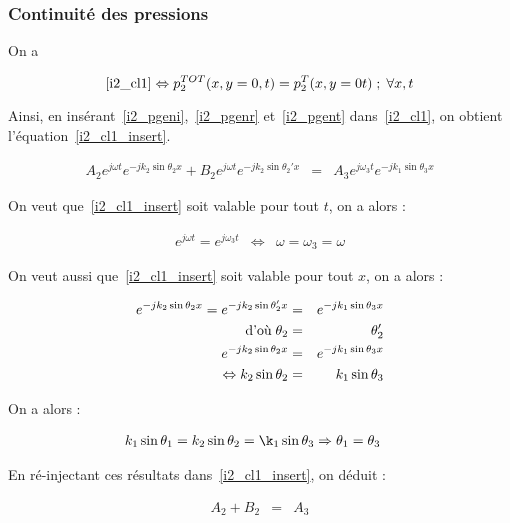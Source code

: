 \subsubsection{Continuité des pressions}

On a 

\begin{equation*}
\eqref{i2_cl1} \Leftrightarrow p^{TOT}_2(x,y=0,t) = p^T_2(x, y=0 t) \;;\; \forall x,t 
\end{equation*}

Ainsi, en insérant~\eqref{i2_pgeni},~\eqref{i2_pgenr} et~\eqref{i2_pgent} dans~\eqref{i2_cl1}, on obtient
l'équation~\eqref{i2_cl1_insert}.

\begin{eqnarray}
    A_2e^{j\omega t}e^{-jk_2\sin\theta_2x} + B_2e^{j\omega t}e^{-jk_2\sin\theta_2'x} & = & A_3e^{j\omega_3t}e^{-jk_1\sin\theta_3x} \label{i2_cl1_insert}
\end{eqnarray}

On veut que~\eqref{i2_cl1_insert} soit valable pour tout $t$, on a alors :

\begin{eqnarray}
    e^{j\omega t} = e^{j\omega_3t} & \Leftrightarrow &\omega = \omega_3 = \omega \label{i2_pulsrel}
\end{eqnarray}

On veut aussi que~\eqref{i2_cl1_insert} soit valable pour tout $x$, on a alors :

\begin{eqnarray}
    e^{-jk_2\sin\theta_2x} = e^{-jk_2\sin\theta_2'x} & = & e^{-jk_1\sin\theta_3x}\notag\\
    \text{d'où}\;\theta_2 & = & \theta_2'\label{i2_theta1rel}\\
    e^{-jk_2\sin\theta_2x} & = & e^{-jk_1\sin\theta_3x}\notag\\
    \Leftrightarrow k_2\sin\theta_2 & = & k_1\sin\theta_3 \label{i2_snellrel}
\end{eqnarray}

On a alors :

\begin{eqnarray}
	k_1\sin\theta_1 = k_2\sin\theta_2 = \k_1\sin\theta_3 & \Rightarrow \theta_1 = \theta_3 \label{f_theta13}
\end{eqnarray}

En ré-injectant ces résultats dans~\eqref{i2_cl1_insert}, on déduit :

\begin{eqnarray}
    A_2 + B_2 & = & A_3 \label{i2_amplirel}
\end{eqnarray}


